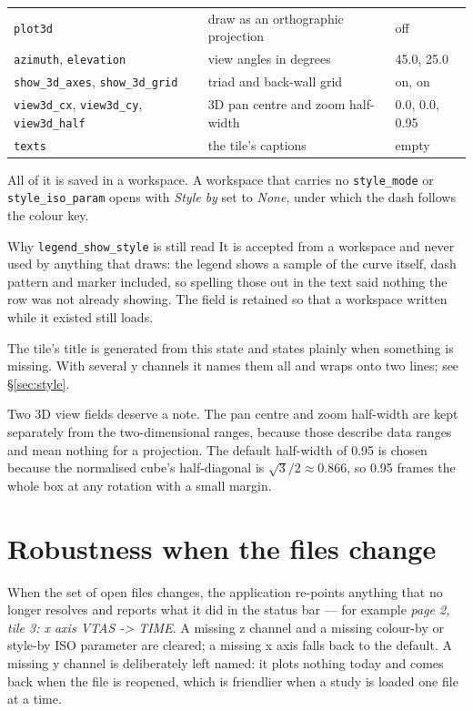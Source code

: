 \documentclass[11pt,a4paper,oneside]{report}
\newcommand{\code}[1]{\texttt{#1}}
\begin{document}
\begin{center}
\begin{longtable}{@{}p{}p{}p{}@{}}
\code{plot3d} & draw as an orthographic projection & off \\
\code{azimuth}, \code{elevation} & view angles in degrees & 45.0, 25.0 \\
\code{show\_3d\_axes}, \code{show\_3d\_grid} & triad and back-wall grid & on, on \\
\code{view3d\_cx}, \code{view3d\_cy}, \code{view3d\_half} & 3D pan centre and zoom half-width & 0.0, 0.0, 0.95 \\
\code{texts} & the tile's captions & empty \\
\bottomrule
\end{longtable}
\end{center}

All of it is saved in a workspace. A workspace that carries no
\code{style\_mode} or \code{style\_iso\_param} opens with \emph{Style by} set
to \emph{None}, under which the dash follows the colour key.

\begin{aoenote}{Why \code{legend\_show\_style} is still read}
It is accepted from a workspace and never used by anything that draws: the
legend shows a sample of the curve itself, dash pattern
and marker included, so spelling those out in the text said nothing the row was
not already showing. The field is retained so that a workspace written while it
existed still loads.
\end{aoenote}

The tile's title is generated from this state and states plainly when something
is missing. With several y channels it names them all and wraps onto two lines;
see \S\ref{sec:style}.

Two 3D view fields deserve a note. The pan centre and zoom half-width are kept
separately from the two-dimensional ranges, because those describe data ranges
and mean nothing for a projection. The default half-width of 0.95 is chosen
because the normalised cube's half-diagonal is $\sqrt{3}/2 \approx 0.866$, so
0.95 frames the whole box at any rotation with a small margin.

\section{Robustness when the files change}
\label{sec:swap}

When the set of open files changes, the application re-points anything that no
longer resolves and reports what it did in the status bar --- for example
\emph{page 2, tile 3: x axis VTAS -> TIME}. A missing z channel and a missing
colour-by or style-by ISO parameter are cleared; a missing x axis falls back to
the default. A missing y channel is deliberately left named: it plots nothing
today and comes back when the file is reopened, which is friendlier when a study
is loaded one file at a time.
\end{document}
